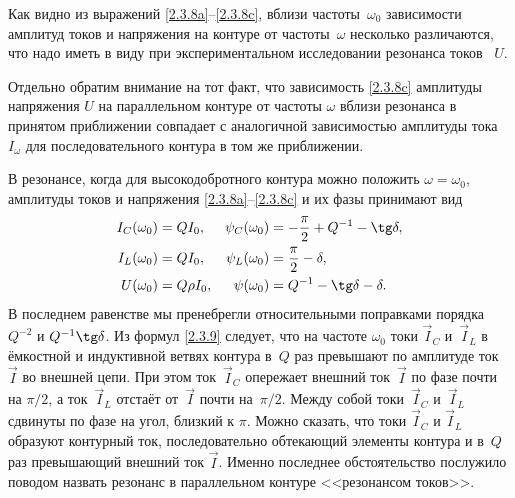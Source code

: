 Как видно из выражений \eqref{2.3.8a}--\eqref{2.3.8c}, 
вблизи частоты~$\omega_0$ зависимости амплитуд токов и напряжения на контуре 
от частоты~$\omega$ несколько различаются, что надо иметь в виду при экспериментальном 
исследовании резонанса токов ~$U.$

Отдельно обратим внимание на тот факт, что зависимость \eqref{2.3.8c} амплитуды
напряжения $U$ на параллельном контуре от частоты $\omega$ вблизи резонанса в
принятом приближении совпадает с аналогичной зависимостью 
амплитуды тока $I_{\omega}$ для последовательного контура в том же приближении.

В резонансе, когда для высокодобротного контура можно положить
$\omega=\omega_0$, амплитуды токов и напряжения \eqref{2.3.8a}--\eqref{2.3.8c}
и их фазы 
принимают вид
\begin{equation}
	\eqmark{2.3.9}
    \begin{aligned}
			 I_C(\omega_0) & = QI_0, & 
                 \psi_C(\omega_0) & = -\dfrac{\pi}{2}+Q^{-1}-\tg\delta, \\
			 I_L(\omega_0) & = QI_0, & \psi_L(\omega_0) & =
                 \dfrac{\pi}{2}-\delta, \\
			U(\omega_0) &= Q\rho I_0, & \psi(\omega_0) & = 
                    Q^{-1}-\tg\delta-\delta.
    \end{aligned}
\end{equation}
В последнем равенстве мы пренебрегли относительными поправками порядка $Q^{-2}$
и $Q^{-1}\tg\delta$. Из формул \eqref{2.3.9} следует, что на частоте $\omega_0$
токи $\vec{I}_{\! C}$ и~$\vec{I}_{\! L}$ в ёмкостной и индуктивной ветвях контура в~$Q$ раз
превышают по амплитуде ток~$\vec{I}$ во внешней цепи. При этом ток~$\vec{I}_{\! C}$
опережает внешний ток~$\vec{I}$ по фазе почти на $\pi/2$, 
а ток~$\vec{I}_{\! L}$ отстаёт от~$\vec{I}$ почти на~$\pi/2$. 
Между собой токи~$\vec{I}_{\! C}$ и~$\vec{I}_{\! L}$ сдвинуты по фазе на угол, 
близкий к  $\pi.$ Можно сказать, что токи $\vec{I}_{\! C}$ и $\vec{I}_{\! L}$ 
образуют контурный ток, последовательно обтекающий элементы контура и 
в~$Q$ раз превышающий внешний ток $\vec{I}$. Именно
последнее обстоятельство послужило поводом назвать резонанс в 
параллельном контуре <<резонансом токов>>.

